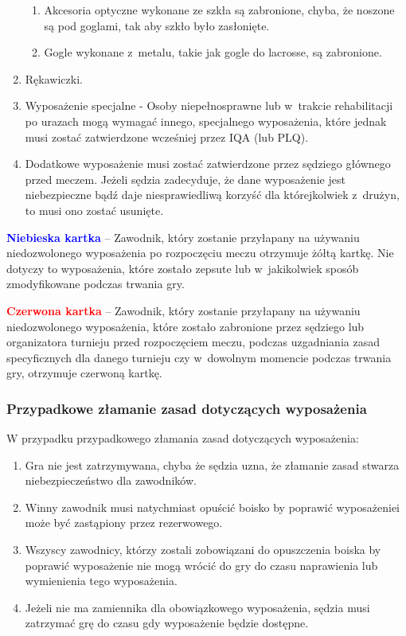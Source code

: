 \documentclass[12pt,a4paper]{article}
\newcommand\redcard[1]{\bgroup\textcolor{red}{\textbf{#1}}}
\newcommand\bluecard[1]{\bgroup\textcolor{blue}{\textbf{#1}}}
\begin{document}
\begin{enumerate}
	      \begin{enumerate}
		      \item
		            Akcesoria optyczne wykonane ze szkła są zabronione, chyba, że
		            noszone są pod goglami, tak aby szkło było zasłonięte.
		      \item
		            Gogle wykonane z~metalu, takie jak gogle do lacrosse, są zabronione.
	      \end{enumerate}
	\item
	      Rękawiczki.
	\item
	      Wyposażenie specjalne - Osoby niepełnosprawne lub w~trakcie
		rehabilitacji po urazach mogą wymagać innego, specjalnego wyposażenia, 
		które jednak musi zostać zatwierdzone wcześniej przez IQA (lub PLQ).
	\item
	      Dodatkowe wyposażenie musi zostać zatwierdzone przez sędziego
	      głównego przed meczem. Jeżeli sędzia zadecyduje, że dane wyposażenie
	      jest niebezpieczne bądź daje niesprawiedliwą korzyść dla którejkolwiek
	      z~drużyn, to musi ono zostać usunięte.
\end{enumerate}

\bluecard{Niebieska kartka} -- Zawodnik, który zostanie przyłapany na
używaniu niedozwolonego wyposażenia po rozpoczęciu meczu otrzymuje żółtą
kartkę. Nie dotyczy to wyposażenia, które zostało zepsute lub w~jakikolwiek sposób zmodyfikowane podczas trwania gry.

\redcard{Czerwona kartka} -- Zawodnik, który zostanie przyłapany na używaniu
niedozwolonego wyposażenia, które zostało zabronione przez sędziego lub
organizatora turnieju przed rozpoczęciem meczu, podczas uzgadniania
zasad specyficznych dla danego turnieju czy w~dowolnym momencie podczas
trwania gry, otrzymuje czerwoną kartkę.

\subsubsection{Przypadkowe złamanie zasad dotyczących wyposażenia}
W przypadku przypadkowego złamania zasad dotyczących wyposażenia:

\begin{enumerate}
	\item
	      Gra nie jest zatrzymywana, chyba że sędzia uzna, że złamanie zasad
	      stwarza niebezpieczeństwo dla zawodników.
	\item
	      Winny zawodnik musi natychmiast opuścić boisko by poprawić
	      wyposażeniei może być zastąpiony przez rezerwowego.
	\item
	      Wszyscy zawodnicy, którzy zostali zobowiązani do opuszczenia boiska by
	      poprawić wyposażenie nie mogą wrócić do gry do czasu naprawienia lub
	      wymienienia tego wyposażenia.
	\item
	      Jeżeli nie ma zamiennika dla obowiązkowego wyposażenia, sędzia musi
	      zatrzymać grę do czasu gdy wyposażenie będzie dostępne.
\end{enumerate}
\end{document}
